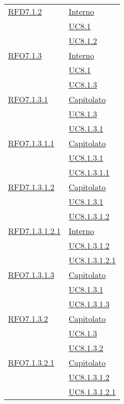 \begin{longtable}{|>{\centering}m{5cm}|m{5cm}<{\centering}|}
\hyperlink{RFD7.1.2}{RFD7.1.2} & \hyperlink{Interno}{Interno}\\
& \hyperref[UC8.1]{UC8.1}\\
& \hyperref[UC8.1.2]{UC8.1.2}\\ \hline

\hyperlink{RFO7.1.3}{RFO7.1.3} & \hyperlink{Interno}{Interno}\\
& \hyperref[UC8.1]{UC8.1}\\
& \hyperref[UC8.1.3]{UC8.1.3}\\ \hline

\hyperlink{RFO7.1.3.1}{RFO7.1.3.1} & \hyperlink{Capitolato}{Capitolato}\\
& \hyperref[UC8.1.3]{UC8.1.3}\\
& \hyperref[UC8.1.3.1]{UC8.1.3.1}\\ \hline

\hyperlink{RFO7.1.3.1.1}{RFO7.1.3.1.1} & \hyperlink{Capitolato}{Capitolato}\\
& \hyperref[UC8.1.3.1]{UC8.1.3.1}\\
& \hyperref[UC8.1.3.1.1]{UC8.1.3.1.1}\\ \hline

\hyperlink{RFD7.1.3.1.2}{RFD7.1.3.1.2} & \hyperlink{Capitolato}{Capitolato}\\
& \hyperref[UC8.1.3.1]{UC8.1.3.1}\\
& \hyperref[UC8.1.3.1.2]{UC8.1.3.1.2}\\ \hline

\hyperlink{RFD7.1.3.1.2.1}{RFD7.1.3.1.2.1} & \hyperlink{Interno}{Interno}\\
& \hyperref[UC8.1.3.1.2]{UC8.1.3.1.2}\\
& \hyperref[UC8.1.3.1.2.1]{UC8.1.3.1.2.1}\\ \hline

\hyperlink{RFO7.1.3.1.3}{RFO7.1.3.1.3} & \hyperlink{Capitolato}{Capitolato}\\
& \hyperref[UC8.1.3.1]{UC8.1.3.1}\\
& \hyperref[UC8.1.3.1.3]{UC8.1.3.1.3}\\ \hline

\hyperlink{RFO7.1.3.2}{RFO7.1.3.2} & \hyperlink{Capitolato}{Capitolato}\\
& \hyperref[UC8.1.3]{UC8.1.3}\\
& \hyperref[UC8.1.3.2]{UC8.1.3.2}\\ \hline

\hyperlink{RFO7.1.3.2.1}{RFO7.1.3.2.1} & \hyperlink{Capitolato}{Capitolato}\\
& \hyperref[UC8.1.3.1.2]{UC8.1.3.1.2}\\
& \hyperref[UC8.1.3.1.2.1]{UC8.1.3.1.2.1}\\ \hline


\end{longtable}
